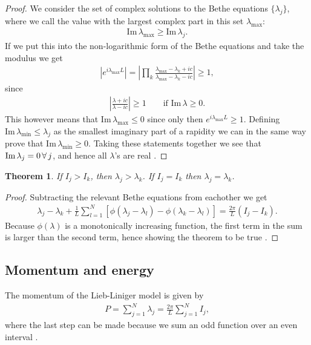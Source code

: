 \documentclass[11pt, a4paper]{report} %
\newtheorem{theorem}{Theorem}
\begin{document}
\begin{proof}
We consider the set of complex solutions to the Bethe equations \(\{\lambda_j\}\), where we call the value with the largest complex part in this set \(\lambda_{\textrm{max}}\):
\begin{align}
\textrm{Im} \, \lambda_{\textrm{max}} \geq \textrm{Im} \, \lambda_j.
\end{align}
If we put this into the non-logarithmic form of the Bethe equations and take the modulus we get
\begin{align}
  \left| e^{i\lambda_{\textrm{max}} L} \right|= \left| \prod_k \frac{\lambda_{\textrm{max}} - \lambda_k + ic}{\lambda_{\textrm{max}} - \lambda_k - ic} \right|\geq 1,
\end{align}
since
\begin{align}
\left|\frac{\lambda+ic}{\lambda-ic} \right| \geq 1 \qquad \textrm{if Im}\, \lambda \geq 0.
\end{align}
This however means that \(\textrm{Im}\, \lambda_{\textrm{max}} \leq 0\) since only then \(e^{i\lambda_{\textrm{max}}L} \geq 1\).
Defining \(\textrm{Im}\,\lambda_{\min}\leq \lambda_j\) as the smallest imaginary part of a rapidity we can in the same way prove that \(\textrm{Im}\,\lambda_{\min} \geq 0\).
Taking these statements together we see that \(\textrm{Im}\, \lambda_{j}=0\textrm{\,}\forall\textrm{\,} j\), and hence all  \(\lambda\)'s are real \cite{Korepin1993}.
\end{proof}

\begin{theorem}
If \(I_j >I_k\), then \(\lambda_j > \lambda_k\). If \(I_j=I_k\) then \(\lambda_j=\lambda_k\).
\end{theorem}

\begin{proof}
Subtracting the relevant Bethe equations from eachother we get
\begin{align}
  \lambda_j - \lambda_k + \frac{1}{L}\sum_{l=1}^N \left[\phi(\lambda_j - \lambda_l) - \phi(\lambda_k - \lambda_l)\right] = \frac{2\pi}{L} (I_j - I_k).
\end{align}
Because \(\phi(\lambda)\) is a monotonically increasing function, the first term in the sum is larger than the second term, hence showing the theorem to be true \cite{Korepin1993}.
\end{proof}

\subsection{Momentum and energy}
The momentum of the Lieb-Liniger model is given by
\begin{align}
  P = \sum_{j=1}^N \lambda_j = \frac{2\pi}{L}\sum_{j=1}^N I_j,
\end{align}
where the last step can be made because we sum an odd function over an even interval \cite{Korepin1993}.
\end{document}
